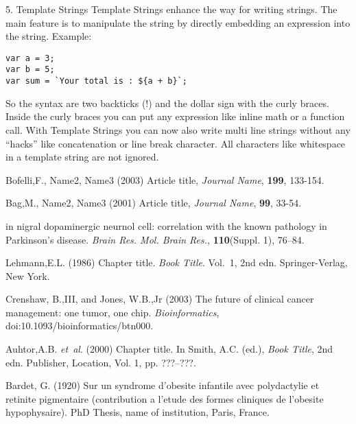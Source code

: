 \documentclass{bioinfo}
\begin{document}
5. Template Strings
Template Strings enhance the way for writing strings. The main feature is to manipulate the string by
directly embedding an expression into the string.
Example:
\begin{lstlisting}
var a = 3;
var b = 5;
var sum = `Your total is : ${a + b}`;
\end{lstlisting}
So the syntax are two backticks (!) and the dollar sign with the curly braces.
Inside the curly braces you can put any expression like inline math or a function call.
With Template Strings you can now also write multi line strings without any ``hacks'' like
concatenation or line break character. All characters like whitespace in a template string
are not ignored.

%
%
%
%
%
%
%
%
%

\begin{thebibliography}{}
 Bofelli,F., Name2, Name3 (2003) Article title, {\it Journal Name}, {\bf 199}, 133-154.

 Bag,M., Name2, Name3 (2001) Article title, {\it Journal Name}, {\bf 99}, 33-54.

in nigral dopaminergic neurnol cell: correlation with the known
pathology in Parkinson's disease. \textit{Brain Res. Mol. Brain
Res.}, \textbf{110}(Suppl. 1), 76--84.

Lehmann,E.L. (1986) Chapter title. \textit{Book Title}. Vol.~1, 2nd edn. Springer-Verlag, New York.

Crenshaw, B.,III, and Jones, W.B.,Jr (2003) The future of clinical
cancer management: one tumor, one chip. \textit{Bioinformatics},
doi:10.1093/bioinformatics/btn000.

Auhtor,A.B. \textit{et~al}. (2000) Chapter title. In Smith, A.C.
(ed.), \textit{Book Title}, 2nd edn. Publisher, Location, Vol. 1, pp.
???--???.

Bardet, G. (1920) Sur un syndrome d'obesite infantile avec
polydactylie et retinite pigmentaire (contribution a l'etude des
formes cliniques de l'obesite hypophysaire). PhD Thesis, name of
institution, Paris, France.

\end{thebibliography}
\end{document}
